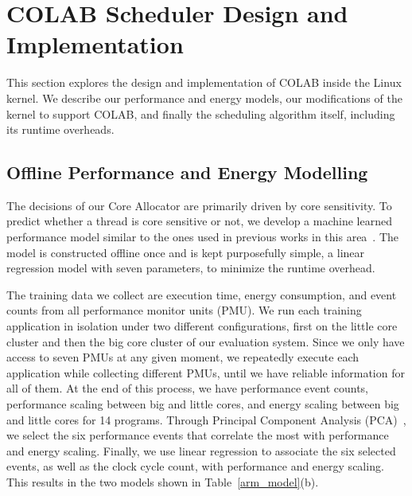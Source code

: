 \section{COLAB Scheduler Design and Implementation}
This section explores the design and implementation of COLAB inside the Linux kernel. We describe our performance and energy models, our modifications of the kernel to support COLAB, and finally the scheduling algorithm itself, including its runtime overheads.

\subsection{Offline Performance and Energy Modelling}
The decisions of our Core Allocator are primarily driven by core sensitivity. To predict whether a thread is core sensitive or not, we develop a machine learned performance model similar to the ones used in previous works in this area~\cite{van2013fairness,jibaja2016portable,saez2012leveraging}. The model is constructed offline once and is kept purposefully simple, a linear regression model with seven parameters, to minimize the runtime overhead. 



The training data we collect are execution time, energy consumption, and event counts from all performance monitor units (PMU). We run each training application in isolation under two different configurations, first on the little core cluster and then the big core cluster of our evaluation system. Since we only have access to seven PMUs at any given moment, we repeatedly execute each application while collecting different PMUs, until we have reliable information for all of them. At the end of this process, we have performance event counts, performance scaling between big and little cores, and energy scaling between big and little cores for 14 programs. Through Principal Component Analysis (PCA)~\cite{witten2016data}, we select the six performance events that correlate the most with performance and energy scaling. Finally, we use linear regression to associate the six selected events, as well as the clock cycle count, with performance and energy scaling. This results in the two models shown in Table~\ref{arm_model}(b).

